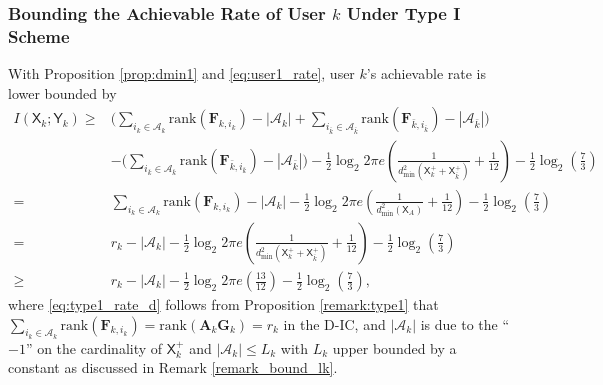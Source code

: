 \documentclass[12pt, draftclsnofoot, onecolumn]{IEEEtran}
\newcommand{\msf}[1]{\mathsf{#1}}
\theoremstyle{definition}
\begin{document}
\subsubsection{Bounding the Achievable Rate of User $k$ Under Type I Scheme}
With Proposition \ref{prop:dmin1} and \eqref{eq:user1_rate}, user $k$'s achievable rate is lower bounded by
\begin{subequations}\label{eq:type1_rate}
\begin{align}
I(\msf{X}_k;\msf{Y}_k) \geq & \bigg(\sum_{i_k \in \mathcal{A}_k} \text{rank}(\boldsymbol{F}_{k,i_k})-|\mathcal{A}_k|+\sum_{i_{\bar{k}} \in \mathcal{A}_{\bar{k}}} \text{rank}(\boldsymbol{F}_{\bar{k},i_{\bar{k}}})-|\mathcal{A}_{\bar{k}}|\bigg) \nonumber \\
&-\bigg(\sum_{i_{\bar{k}} \in \mathcal{A}_{\bar{k}}} \text{rank}(\boldsymbol{F}_{\bar{k},i_{\bar{k}}})-|\mathcal{A}_{\bar{k}}|\bigg) %
-\frac{1}{2}\log_2 2\pi e \left(\frac{1}{ d^2_{\min}(\msf{X}^{+}_k+\msf{X}^{+}_{\bar{k}})} + \frac{1}{12}\right)-\frac{1}{2}\log_2\left( \frac{7}{3}\right) \nonumber \\
=&\sum_{i_k \in \mathcal{A}_k} \text{rank}(\boldsymbol{F}_{k,i_k})- |\mathcal{A}_k|-\frac{1}{2}\log_2 2\pi e \left(\frac{1}{ d^2_{\min}(\msf{X}_A)} + \frac{1}{12}\right)-\frac{1}{2}\log_2\left( \frac{7}{3}\right) \nonumber \\
=& r_k-|\mathcal{A}_k|-\frac{1}{2}\log_2 2\pi e \left(\frac{1}{ d^2_{\min}(\msf{X}^{+}_k+\msf{X}^{+}_{\bar{k}})} + \frac{1}{12}\right)-\frac{1}{2}\log_2\left( \frac{7}{3}\right) \label{eq:type1_rate_d} \\
\geq& r_k -|\mathcal{A}_k|- \frac{1}{2}\log_2 2\pi e \left(\frac{13}{12} \right)-\frac{1}{2}\log_2\left( \frac{7}{3}\right),
\end{align}
\end{subequations}
where \eqref{eq:type1_rate_d} follows from Proposition \ref{remark:type1} that $\sum_{i_k \in \mathcal{A}_k} \text{rank}(\boldsymbol{F}_{k,i_k})=\text{rank}(\boldsymbol{A}_k\boldsymbol{G}_k)=r_k$ in the D-IC, and $|\mathcal{A}_k|$ is due to the ``$-1$'' on the cardinality of $\msf{X}^{+}_k$ and $|\mathcal{A}_k|  \leq L_k$ with $L_k$ upper bounded by a constant as discussed in Remark \ref{remark_bound_lk}.
\end{document}
